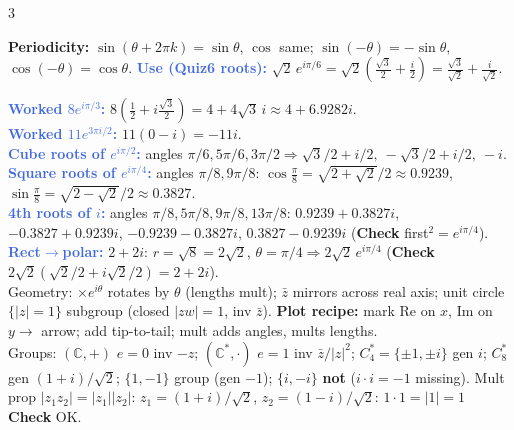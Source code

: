 \documentclass[9pt]{extarticle}
\newcommand{\hl}[1]{\textbf{\textcolor{BrickRed}{#1}}}
\newcommand{\wk}[1]{\textbf{\textcolor{OliveGreen}{#1}}}
\newcommand{\ex}[1]{\textbf{\textcolor{RoyalBlue}{#1}}}
\begin{document}
\begin{multicols}{3}
\begin{center}
\end{center}
\begin{sloppypar}\raggedright
\hl{Periodicity:} $\sin(\theta{+}2\pi k){=}\sin\theta$, $\cos$ same; $\sin({-}\theta){=}{-}\sin\theta$, $\cos({-}\theta){=}\cos\theta$. \ex{Use (Quiz6 roots):} $\sqrt{2}\,e^{i\pi/6}{=}\sqrt2\left(\tfrac{\sqrt3}2{+}\tfrac i2\right){=}\tfrac{\sqrt3}{\sqrt2}{+}\tfrac{i}{\sqrt2}$.
\end{sloppypar}
\begin{sloppypar}\raggedright
\ex{Worked $8e^{i\pi/3}$:} $8(\frac12{+}i\frac{\sqrt3}{2}){=}4{+}4\sqrt3\,i{\approx}4{+}6.9282i$.\\
\ex{Worked $11e^{3\pi i/2}$:} $11(0{-}i){=}{-}11i$.\\
\ex{Cube roots of $e^{i\pi/2}$:} angles $\pi/6,5\pi/6,3\pi/2\Rightarrow\sqrt3/2{+}i/2,\ {-}\sqrt3/2{+}i/2,\ {-}i$.\\
\ex{Square roots of $e^{i\pi/4}$:} angles $\pi/8,9\pi/8$: $\cos\frac\pi8{=}\sqrt{2{+}\sqrt2}/2{\approx}0.9239$, $\sin\frac\pi8{=}\sqrt{2{-}\sqrt2}/2{\approx}0.3827$.\\
\ex{4th roots of $i$:} angles $\pi/8,5\pi/8,9\pi/8,13\pi/8$: $0.9239{+}0.3827i$, ${-}0.3827{+}0.9239i$, ${-}0.9239{-}0.3827i$, $0.3827{-}0.9239i$ (\wk{Check} first$^2{=}e^{i\pi/4}$).
\ex{Rect$\to$polar:} $2{+}2i$: $r{=}\sqrt8{=}2\sqrt2$, $\theta{=}\pi/4\Rightarrow2\sqrt2\,e^{i\pi/4}$ (\wk{Check} $2\sqrt2(\sqrt2/2{+}i\sqrt2/2){=}2{+}2i$).\\
Geometry: ${\times}e^{i\theta}$ rotates by $\theta$ (lengths mult); $\bar z$ mirrors across real axis; unit circle $\{|z|{=}1\}$ subgroup (closed $|zw|{=}1$, inv $\bar z$). \wk{Plot recipe:} mark Re on $x$, Im on $y\to$ arrow; add tip-to-tail; mult adds angles, mults lengths.\\
Groups: $(\mathbb C,{+})$ $e{=}0$ inv ${-}z$; $(\mathbb C^*,{\cdot})$ $e{=}1$ inv $\bar z/|z|^2$; $C_4^*{=}\{\pm1,\pm i\}$ gen $i$; $C_8^*$ gen $(1{+}i)/\sqrt2$; $\{1,{-}1\}$ group (gen ${-}1$); $\{i,{-}i\}$ \hl{not} ($i{\cdot}i{=}{-}1$ missing). Mult prop $|z_1z_2|{=}|z_1||z_2|$: $z_1{=}(1{+}i)/\sqrt2$, $z_2{=}(1{-}i)/\sqrt2$: $1{\cdot}1{=}|1|{=}1$ \wk{Check} OK.
\end{sloppypar}


\end{multicols}
\end{document}
